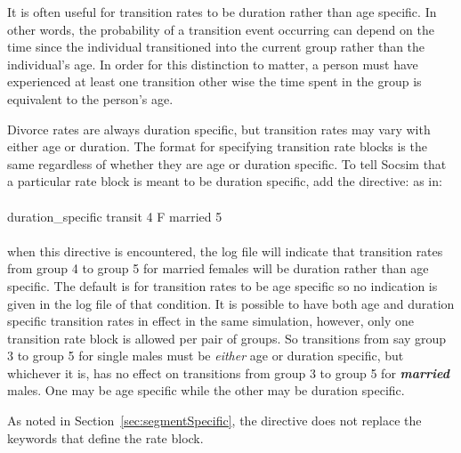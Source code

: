It is often useful for transition rates to be duration rather than age
specific. In other words, the probability of a transition event
occurring can depend on the time since the individual transitioned
into the current group rather than the individual's age.  In order for
this distinction to matter, a person must have experienced at least
one transition other wise the time spent in the group is equivalent to
the person's age.

Divorce rates are always duration specific, but transition rates may
vary with either age or duration.  The format for specifying
transition rate blocks is the same regardless of whether they are age
or duration specific. To tell Socsim that a particular rate block is
meant to be
duration specific, add the directive:  as in:\\
\\
duration\_specific transit 4 F married 5\\
\\
when this directive is encountered, the log file will indicate that
transition rates from group 4 to group 5 for married females will be
duration rather than age specific.  The default is for transition
rates to be age specific so no indication is given in the log file of
that condition.  It is possible to have both age and duration specific
transition rates in effect in the same simulation, however, only one
transition rate block is allowed per pair of groups.  So transitions
from say group 3 to group 5 for single males must be \emph{either} age
or duration specific, but whichever it is, has no effect on
transitions from group 3 to group 5 for \textbf{\emph{married}}
males. One may be age specific while the other may be duration
specific.

As noted in Section~\ref{sec:segmentSpecific}, the
 directive does not replace the keywords
that define the rate block.

  



